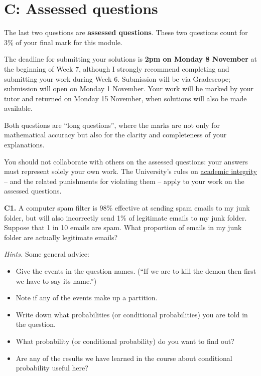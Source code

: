 \documentclass[
  a4paper,
]{book}
\providecommand{\tightlist}{%
  \setlength{\itemsep}{0pt}\setlength{\parskip}{0pt}}
\theoremstyle{definition}
\theoremstyle{definition}
\theoremstyle{definition}
\theoremstyle{definition}
\theoremstyle{remark}
\begin{document}
\hypertarget{P3-assessed}{%
\section*{C: Assessed questions}\label{P3-assessed}}

The last two questions are \textbf{assessed questions}. These two questions count for 3\% of your final mark for this module.

The deadline for submitting your solutions is \textbf{2pm on Monday 8 November} at the beginning of Week 7, although I strongly recommend completing and submitting your work during Week 6. Submission will be via Gradescope; submission will open on Monday 1 November.
Your work will be marked by your tutor and returned on Monday 15 November, when solutions will also be made available.

Both questions are ``long questions'', where the marks are not only for mathematical accuracy but also for the clarity and completeness of your explanations.

You should not collaborate with others on the assessed questions: your answers must represent solely your own work. The University's rules on \href{https://library.leeds.ac.uk/info/1401/academic_skills/46/academic_integrity_and_plagiarism}{academic integrity} -- and the related punishments for violating them -- apply to your work on the assessed questions.

\textbf{C1.} A computer spam filter is 98\% effective at sending spam emails to my junk folder, but will also incorrectly send 1\% of legitimate emails to my junk folder. Suppose that 1 in 10 emails are spam. What proportion of emails in my junk folder are actually legitimate emails?

\begin{myanswers}

\emph{Hints.} Some general advice:

\begin{itemize}
\tightlist
\item
  Give the events in the question names. (``If we are to kill the demon then first we have to say its name.'')
\item
  Note if any of the events make up a partition.
\item
  Write down what probabilities (or conditional probabilities) you are told in the question.
\item
  What probability (or conditional probability) do you want to find out?
\item
  Are any of the results we have learned in the course about conditional probability useful here?
\end{itemize}

\end{myanswers}
\end{document}
